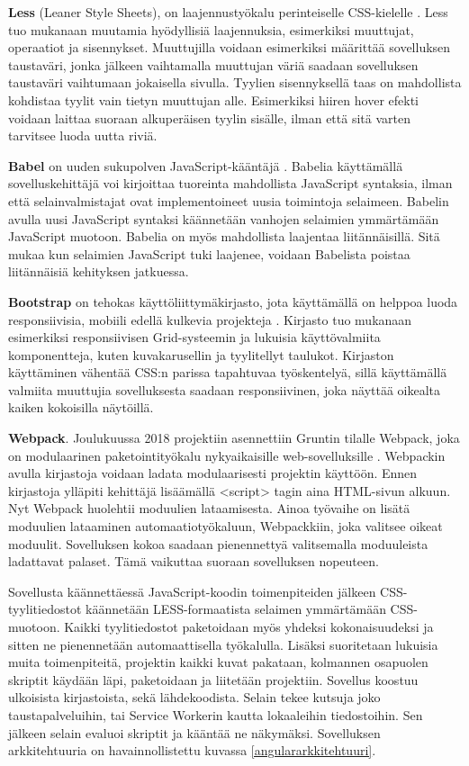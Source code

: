 \documentclass{tktltiki}
\begin{document}
\textbf{Less} (Leaner Style Sheets), on laajennustyökalu perinteiselle CSS-kielelle \cite{7476640}. Less tuo mukanaan muutamia hyödyllisiä laajennuksia, esimerkiksi muuttujat, operaatiot ja sisennykset. Muuttujilla voidaan esimerkiksi määrittää sovelluksen taustaväri, jonka jälkeen vaihtamalla muuttujan väriä saadaan sovelluksen taustaväri vaihtumaan jokaisella sivulla. Tyylien sisennyksellä taas on mahdollista kohdistaa tyylit vain tietyn muuttujan alle. Esimerkiksi hiiren hover efekti voidaan laittaa suoraan alkuperäisen tyylin sisälle, ilman että sitä varten tarvitsee luoda uutta riviä.

\textbf{Babel} on uuden sukupolven JavaScript-kääntäjä \cite{maynard2017getting}. Babelia käyttämällä sovelluskehittäjä voi kirjoittaa tuoreinta mahdollista JavaScript syntaksia, ilman että selainvalmistajat ovat implementoineet uusia toimintoja selaimeen. Babelin avulla uusi JavaScript syntaksi käännetään vanhojen selaimien ymmärtämään JavaScript muotoon. Babelia on myös mahdollista laajentaa liitännäisillä. Sitä mukaa kun selaimien JavaScript tuki laajenee, voidaan Babelista poistaa liitännäisiä kehityksen jatkuessa.

\textbf{Bootstrap} on tehokas käyttöliittymäkirjasto, jota käyttämällä on helppoa luoda responsiivisia, mobiili edellä kulkevia projekteja \cite{balasubramanee2013twitter}. Kirjasto tuo mukanaan esimerkiksi responsiivisen Grid-systeemin ja lukuisia käyttövalmiita komponentteja, kuten kuvakarusellin ja tyylitellyt taulukot. Kirjaston käyttäminen vähentää CSS:n parissa tapahtuvaa työskentelyä, sillä käyttämällä valmiita muuttujia sovelluksesta saadaan responsiivinen, joka näyttää oikealta kaiken kokoisilla näytöillä.

\textbf{Webpack}. Joulukuussa 2018 projektiin asennettiin Gruntin tilalle Webpack, joka on modulaarinen paketointityökalu nykyaikaisille web-sovelluksille \cite{subramanian2017modularization}. Webpackin avulla kirjastoja voidaan ladata modulaarisesti projektin käyttöön. Ennen kirjastoja ylläpiti kehittäjä lisäämällä <script> tagin aina HTML-sivun alkuun. Nyt Webpack huolehtii moduulien lataamisesta. Ainoa työvaihe on lisätä moduulien lataaminen automaatiotyökaluun, Webpackkiin, joka valitsee oikeat moduulit. Sovelluksen kokoa saadaan pienennettyä valitsemalla moduuleista ladattavat palaset. Tämä vaikuttaa suoraan sovelluksen nopeuteen.

Sovellusta käännettäessä JavaScript-koodin toimenpiteiden jälkeen CSS-tyylitiedostot käännetään LESS-formaatista selaimen ymmärtämään CSS-muotoon. Kaikki tyylitiedostot paketoidaan myös yhdeksi kokonaisuudeksi ja sitten ne pienennetään automaattisella työkalulla. Lisäksi suoritetaan lukuisia muita toimenpiteitä, projektin kaikki kuvat pakataan, kolmannen osapuolen skriptit käydään läpi, paketoidaan ja liitetään projektiin. Sovellus koostuu ulkoisista kirjastoista, sekä lähdekoodista. Selain tekee kutsuja joko taustapalveluihin, tai Service Workerin kautta lokaaleihin tiedostoihin. Sen jälkeen selain evaluoi skriptit ja kääntää ne näkymäksi. Sovelluksen arkkitehtuuria on havainnollistettu kuvassa \ref{angulararkkitehtuuri}.
\end{document}
